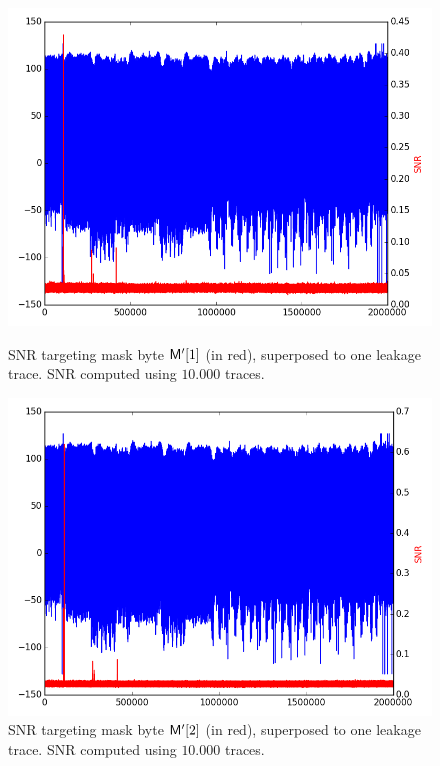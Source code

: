 \begin{figure}[H]
	\centering 
	\includegraphics[scale=0.35]{figures/2Mpts/SNR_M20_10ktraces.png}
	\caption{SNR targeting mask byte $\mathsf{M'}[1]$ (in red), superposed to one leakage trace. SNR computed using $10.000$ traces.}
	\label{fig:SNR_M20}
	\includegraphics[scale=0.35]{figures/2Mpts/SNR_M21_10ktraces.png}
	\caption{SNR targeting mask byte $\mathsf{M'}[2]$ (in red), superposed to one leakage trace. SNR computed using $10.000$ traces.}
	\label{fig:SNR_M21}
\end{figure}


